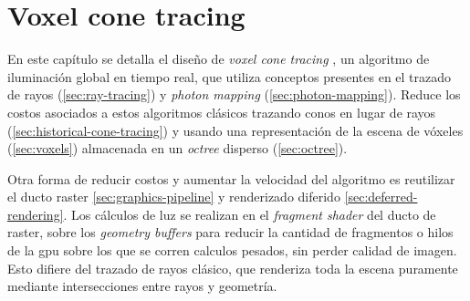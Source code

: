 


\graphicspath{{chapters/3_diseño/figures/}}

\chapter{Voxel cone tracing}\label{chap:design}

En este capítulo se detalla el diseño de \textit{voxel cone tracing} \cite{voxel-cone-tracing}, un algoritmo de iluminación global en tiempo real, que utiliza conceptos presentes en el trazado de rayos (\ref{sec:ray-tracing}) y \textit{photon mapping} (\ref{sec:photon-mapping}).
Reduce los costos asociados a estos algoritmos clásicos trazando conos en lugar de rayos (\ref{sec:historical-cone-tracing}) y usando una representación de la escena de vóxeles (\ref{sec:voxels}) almacenada en un \textit{octree} disperso (\ref{sec:octree}).

Otra forma de reducir costos y aumentar la velocidad del algoritmo es reutilizar el ducto raster \ref{sec:graphics-pipeline} y renderizado diferido \ref{sec:deferred-rendering}.
Los cálculos de luz se realizan en el \textit{fragment shader} del ducto de raster, sobre los \textit{geometry buffers} para reducir la cantidad de fragmentos o hilos de la gpu sobre los que se corren calculos pesados, sin perder calidad de imagen.
Esto difiere del trazado de rayos clásico, que renderiza toda la escena puramente mediante intersecciones entre rayos y geometría.

